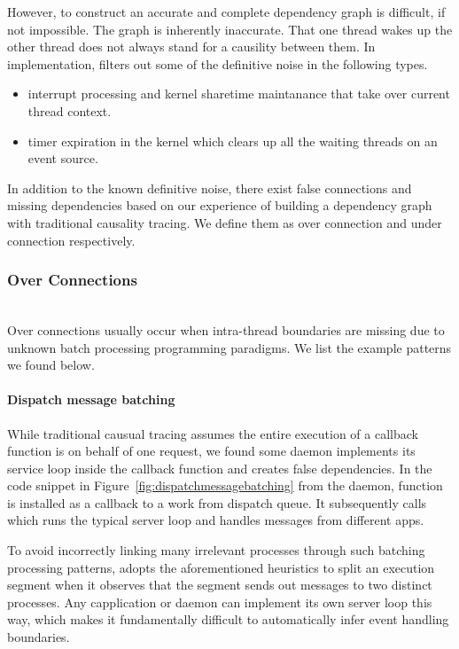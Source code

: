 However, to construct an accurate and complete dependency graph is difficult,
if not impossible. The graph is inherently inaccurate. That one thread wakes
up the other thread does not always stand for a causility between them. In
implementation, \xxx filters out some of the definitive noise in the following
types.

\begin{itemize}

\item interrupt processing and kernel sharetime maintanance that take over
current thread context.

\item timer expiration in the kernel which clears up all the waiting threads on
an event source.

\end{itemize}

In addition to the known definitive noise, there exist false connections and
missing dependencies based on our experience of building a dependency graph
with traditional causality tracing. We define them as over connection and under
connection respectively.

\subsubsection{Over Connections}\hfill\\
Over connections usually occur when intra-thread boundaries are missing due to
unknown batch processing programming paradigms. We list the example patterns we
found below.

\paragraph{Dispatch message batching}
While traditional causual tracing assumes the entire execution of a
callback function is on behalf of one request, we found some daemon
implements its service loop inside the callback function and creates false
dependencies. In the code snippet in Figure~\ref{fig:dispatchmessagebatching} from the  daemon, function
 is installed as a callback to a work from dispatch queue.
It subsequently calls  which runs the typical server
loop and handles messages from different apps.

To avoid incorrectly linking many irrelevant processes through such batching
processing patterns, \xxx adopts the aforementioned heuristics to split an
execution segment when it observes that the segment sends out messages to two
distinct processes. Any capplication or daemon can implement its own server loop
this way, which makes it fundamentally difficult to automatically infer event
handling boundaries.

